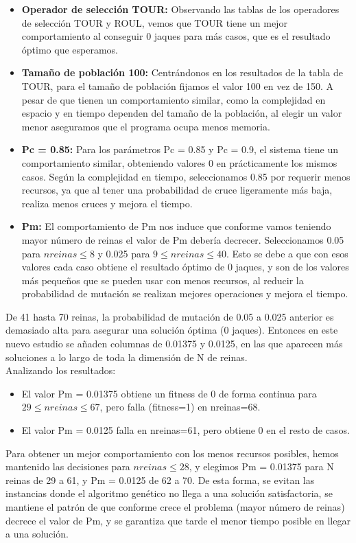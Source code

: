 \documentclass[12pt]{article}
\begin{document}
\begin{itemize}
    \item \textbf{Operador de selección TOUR:} Observando las tablas de los operadores de selección TOUR y ROUL, vemos que TOUR tiene un mejor comportamiento al conseguir 0 jaques para más casos, que es el resultado óptimo que esperamos.
    \item \textbf{Tamaño de población 100:} Centrándonos en los resultados de la tabla de TOUR, para el tamaño de población fijamos el valor 100 en vez de 150. A pesar de que tienen un comportamiento similar, como la complejidad en espacio y en tiempo dependen del tamaño de la población, al elegir un valor menor aseguramos que el programa ocupa menos memoria.
    \item \textbf{Pc = 0.85:} Para los parámetros Pc = 0.85 y Pc = 0.9, el sistema tiene un comportamiento similar, obteniendo valores 0 en prácticamente los mismos casos. Según la complejidad en tiempo, seleccionamos 0.85 por requerir menos recursos, ya que al tener una probabilidad de cruce ligeramente más baja, realiza menos cruces y mejora el tiempo.
    \item \textbf{Pm:} El comportamiento de Pm nos induce que conforme vamos teniendo mayor número de reinas el valor de Pm debería decrecer. Seleccionamos 0.05 para \(nreinas \leq 8\) y 0.025 para \(9 \leq nreinas \leq 40\). Esto se debe a que con esos valores cada caso obtiene el resultado óptimo de 0 jaques, y son de los valores más pequeños que se pueden usar con menos recursos, al reducir la probabilidad de mutación se realizan mejores operaciones y mejora el tiempo.
\end{itemize}
De 41 hasta 70 reinas, la probabilidad de mutación de 0.05 a 0.025 anterior es demasiado alta para asegurar una solución óptima (0 jaques). Entonces en este nuevo estudio se añaden columnas de 0.01375 y 0.0125, en las que aparecen más soluciones a lo largo de toda la dimensión de N de reinas.\\
Analizando los resultados:
\begin{itemize}
    \item El valor Pm = 0.01375 obtiene un fitness de 0 de forma continua para \(29 \leq nreinas \leq 67\), pero falla (fitness=1) en nreinas=68.
    \item El valor Pm = 0.0125 falla en nreinas=61, pero obtiene 0 en el resto de casos.
\end{itemize}
Para obtener un mejor comportamiento con los menos recursos posibles, hemos mantenido las decisiones para \(nreinas \leq 28\), y elegimos Pm = 0.01375 para N reinas de 29 a 61, y Pm = 0.0125 de 62 a 70. De esta forma, se evitan las instancias donde el algoritmo genético no llega a una solución satisfactoria, se mantiene el patrón de que conforme crece el problema (mayor número de reinas) decrece el valor de Pm, y se garantiza que tarde el menor tiempo posible en llegar a una solución.
\end{document}
